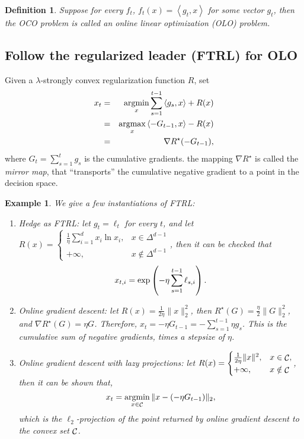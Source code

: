 \documentclass{article}
\newtheorem{example}{Example}
\newtheorem{definition}{Definition}
\DeclareMathOperator*{\Ccal}{{\cal C}}
\DeclareMathOperator*{\argmin}{{\rm argmin}}
\DeclareMathOperator*{\argmax}{{\rm argmax}}
\newcommand{\inner}[2]{\left\langle #1,#2 \right\rangle}
\begin{document}
\begin{definition}
  Suppose for every $f_t$, $f_t(x) = \inner{g_t}{x}$ for some vector $g_t$,
  then the OCO problem is called an online linear optimization (OLO) problem.
\end{definition}

\subsection{Follow the regularized leader (FTRL) for OLO}
Given a $\lambda$-strongly convex regularization function $R$, set
\begin{eqnarray*}
  x_t &=& \argmin_{x} \sum_{s=1}^{t-1} \inner{g_s}{x} + R(x) \\
  &=& \argmax_{x} \inner{-G_{t-1}}{x} - R(x) \\
  &=& \nabla R^\star(-G_{t-1}),
\end{eqnarray*}
where $G_t = \sum_{s=1}^{t} g_s$ is the cumulative gradients. the mapping $\nabla R^\star$ is called the {\em mirror map}, that ``transports'' the cumulative negative gradient to a point in the decision space.

\begin{example}
We give a few instantiations of FTRL:
\begin{enumerate}
\item Hedge as FTRL: let $g_t = \ell_t$ for every $t$, and let $R(x) = \begin{cases} \frac1\eta \sum_{i=1}^d x_i \ln x_i, & x \in \Delta^{d-1} \\
 +\infty, & x \notin \Delta^{d-1} \end{cases}$, then it can be checked that
 \[ x_{t,i} = \exp\del{-\eta \sum_{s=1}^{t-1} \ell_{s,i}}. \]

\item Online gradient descent: let $R(x) = \frac{1}{2\eta}\| x \|_2^2$, then $R^\star(G) = \frac{\eta}{2} \| G \|_2^2$, and $\nabla R^\star(G) = \eta G$.
Therefore, $x_t = -\eta G_{t-1} = - \sum_{s=1}^{t-1} \eta g_s$. This is the cumulative sum of negative gradients, times a stepsize of $\eta$.

\item Online gradient descent with lazy projections: let $R(x) = \begin{cases} \frac{1}{2\eta}\| x \|^2,& x \in \Ccal, \\ +\infty, & x \notin \Ccal \end{cases}$, then it can be shown that,
\[ x_t = \argmin_{x \in \Ccal} \| x - (-\eta G_{t-1}) \|_2, \]
which is the $\ell_2$-projection of the point returned by online gradient descent to the convex set $\Ccal$.
\end{enumerate}
\end{example}
\end{document}

